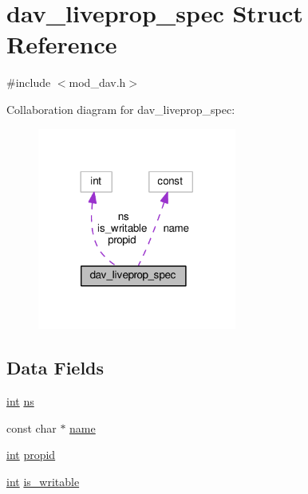 \hypertarget{structdav__liveprop__spec}{}\section{dav\+\_\+liveprop\+\_\+spec Struct Reference}
\label{structdav__liveprop__spec}


{\ttfamily \#include $<$mod\+\_\+dav.\+h$>$}



Collaboration diagram for dav\+\_\+liveprop\+\_\+spec\+:
\nopagebreak
\begin{figure}[H]
\begin{center}
\leavevmode
\includegraphics[width=185pt]{structdav__liveprop__spec__coll__graph}
\end{center}
\end{figure}
\subsection*{Data Fields}
\begin{DoxyCompactItemize}
\item 
\hyperlink{pcre_8txt_a42dfa4ff673c82d8efe7144098fbc198}{int} \hyperlink{structdav__liveprop__spec_abfd7ee4ace341c9c7b9f66a7d34fd049}{ns}
\item 
const char $\ast$ \hyperlink{structdav__liveprop__spec_ae8cf566af412b4ca52f21b3afe095e21}{name}
\item 
\hyperlink{pcre_8txt_a42dfa4ff673c82d8efe7144098fbc198}{int} \hyperlink{structdav__liveprop__spec_a31fc4cf78979d24ec23ca9ee1631856c}{propid}
\item 
\hyperlink{pcre_8txt_a42dfa4ff673c82d8efe7144098fbc198}{int} \hyperlink{structdav__liveprop__spec_a57b58fba23a10087f055357a9768638a}{is\+\_\+writable}
\end{DoxyCompactItemize}


